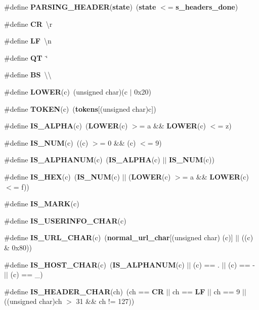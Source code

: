 \begin{DoxyCompactItemize}
\#define {\bf P\+A\+R\+S\+I\+N\+G\+\_\+\+H\+E\+A\+D\+ER}({\bf state})~({\bf state} $<$= {\bf s\+\_\+headers\+\_\+done})
\item 
\#define {\bf CR}~\textquotesingle{}\textbackslash{}r\textquotesingle{}
\item 
\#define {\bf LF}~\textquotesingle{}\textbackslash{}n\textquotesingle{}
\item 
\#define {\bf QT}~\textquotesingle{}\char`\"{}\textquotesingle{}
\item 
\#define {\bf BS}~\textquotesingle{}\textbackslash{}\textbackslash{}\textquotesingle{}
\item 
\#define {\bf L\+O\+W\+ER}(c)~(unsigned char)(c $\vert$ 0x20)
\item 
\#define {\bf T\+O\+K\+EN}(c)~({\bf tokens}[(unsigned char)c])
\item 
\#define {\bf I\+S\+\_\+\+A\+L\+P\+HA}(c)~({\bf L\+O\+W\+ER}(c) $>$= \textquotesingle{}a\textquotesingle{} \&\& {\bf L\+O\+W\+ER}(c) $<$= \textquotesingle{}z\textquotesingle{})
\item 
\#define {\bf I\+S\+\_\+\+N\+UM}(c)~((c) $>$= \textquotesingle{}0\textquotesingle{} \&\& (c) $<$= \textquotesingle{}9\textquotesingle{})
\item 
\#define {\bf I\+S\+\_\+\+A\+L\+P\+H\+A\+N\+UM}(c)~({\bf I\+S\+\_\+\+A\+L\+P\+HA}(c) $\vert$$\vert$ {\bf I\+S\+\_\+\+N\+UM}(c))
\item 
\#define {\bf I\+S\+\_\+\+H\+EX}(c)~({\bf I\+S\+\_\+\+N\+UM}(c) $\vert$$\vert$ ({\bf L\+O\+W\+ER}(c) $>$= \textquotesingle{}a\textquotesingle{} \&\& {\bf L\+O\+W\+ER}(c) $<$= \textquotesingle{}f\textquotesingle{}))
\item 
\#define {\bf I\+S\+\_\+\+M\+A\+RK}(c)
\item 
\#define {\bf I\+S\+\_\+\+U\+S\+E\+R\+I\+N\+F\+O\+\_\+\+C\+H\+AR}(c)
\item 
\#define {\bf I\+S\+\_\+\+U\+R\+L\+\_\+\+C\+H\+AR}(c)~({\bf normal\+\_\+url\+\_\+char}[(unsigned char) (c)] $\vert$$\vert$ ((c) \& 0x80))
\item 
\#define {\bf I\+S\+\_\+\+H\+O\+S\+T\+\_\+\+C\+H\+AR}(c)~({\bf I\+S\+\_\+\+A\+L\+P\+H\+A\+N\+UM}(c) $\vert$$\vert$ (c) == \textquotesingle{}.\textquotesingle{} $\vert$$\vert$ (c) == \textquotesingle{}-\/\textquotesingle{} $\vert$$\vert$ (c) == \textquotesingle{}\+\_\+\textquotesingle{})
\item 
\#define {\bf I\+S\+\_\+\+H\+E\+A\+D\+E\+R\+\_\+\+C\+H\+AR}(ch)~(ch == {\bf CR} $\vert$$\vert$ ch == {\bf LF} $\vert$$\vert$ ch == 9 $\vert$$\vert$ ((unsigned char)ch $>$ 31 \&\& ch != 127))
$$
\end{DoxyCompactItemize}
